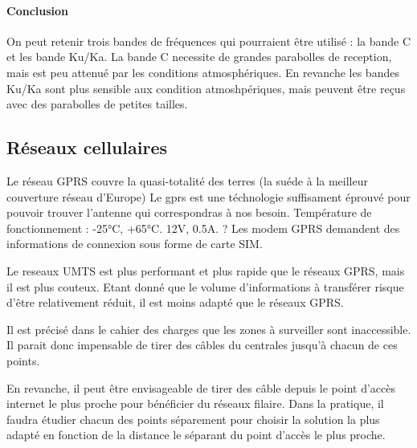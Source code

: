            \paragraph{Conclusion}
                On peut retenir trois bandes de fréquences qui pourraient être utilisé : la bande C et les bande Ku/Ka.
                La bande C necessite de grandes parabolles de reception, mais est peu attenué par les conditions atmosphériques.
                En revanche les bandes Ku/Ka sont plus sensible aux condition atmoshpériques, mais peuvent être reçus avec des parabolles de petites tailles.

        \subsection{Réseaux cellulaires}

                {Le réseau GPRS couvre la quasi-totalité des terres (la suéde à la meilleur couverture réseau d'Europe)
                Le gprs est une téchnologie suffisament éprouvé pour pouvoir trouver l'antenne qui correspondras à nos besoin.}
                {Température de fonctionnement : -25°C, +65°C.}
                {12V, 0.5A.}
                {?}
                {Les modem GPRS demandent des informations de connexion sous forme de carte SIM.}
                {}


                {Le reseaux UMTS est plus performant et plus rapide que le réseaux GPRS, mais il est plus couteux.
                Etant donné que le volume d'informations à transférer risque d'être relativement réduit, il est moins adapté que le réseaux GPRS.}
                {}
                {}
                {}
                {}
                {}
                    
                {Il est précisé dans le cahier des charges que les zones à surveiller sont inaccessible.
                 Il parait donc impensable de tirer des câbles du centrales jusqu'à chacun de ces points.

                 En revanche, il peut être envisageable de tirer des câble depuis le point d'accès internet le plus proche pour bénéficier du réseaux filaire.
                 Dans la pratique, il faudra étudier chacun des points séparement pour choisir la solution la plus adapté en fonction de la distance le séparant du point d'accès le plus proche.}
                {}
                {}
                {}
                {}
                {}
            
